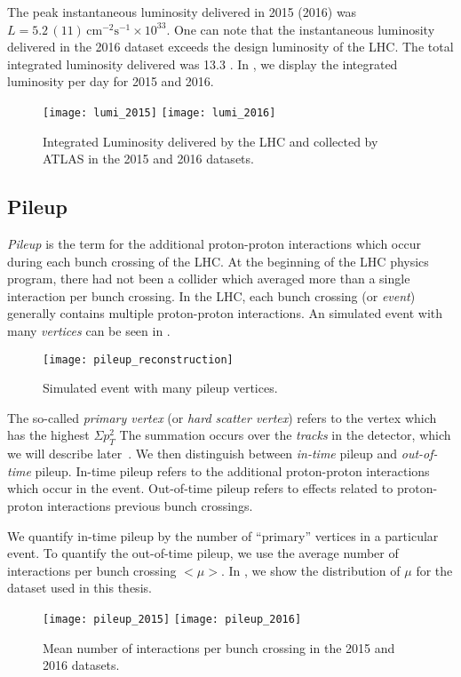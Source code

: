 The peak instantaneous luminosity delivered in 2015 (2016) was $L = 5.2 \, (11) \, \text{cm}^{-2} \text{s}^{-1} \times 10^{33} $.
One can note that the instantaneous luminosity delivered in the 2016 dataset exceeds the design luminosity of the LHC.
The total integrated luminosity delivered was 13.3 \ifb.
In , we display the integrated luminosity per day for 2015 and 2016.
\begin{figure}
\caption{Integrated Luminosity delivered by the LHC and collected by ATLAS in the 2015 and 2016 datasets.}\label{fig:lumi}
\texttt{[image: lumi\_2015]}
\texttt{[image: lumi\_2016]}
\end{figure}

\subsection{Pileup}

\textit{Pileup} is the term for the additional proton-proton interactions which occur during each bunch crossing of the LHC.
At the beginning of the LHC physics program, there had not been a collider which averaged more than a single interaction per bunch crossing.
In the LHC, each bunch crossing (or \textit{event})  generally contains multiple proton-proton interactions.
An simulated event with many \textit{vertices} can be seen in .
\begin{figure}
\caption{Simulated event with many pileup vertices.}\label{fig:pileup_reconstruction}
\texttt{[image: pileup\_reconstruction]}
\end{figure}
The so-called \textit{primary vertex} (or \textit{hard scatter vertex}) refers to the vertex which has the highest $\Sigma p_T^2$
The summation occurs over the \textit{tracks} in the detector, which we will describe later~\cite{ATL-INDET-PUB-2009-001}.
We then distinguish between \textit{in-time} pileup and \textit{out-of-time} pileup.
In-time pileup refers to the additional proton-proton interactions which occur in the event.
Out-of-time pileup refers to effects related to proton-proton interactions previous bunch crossings.

We quantify in-time pileup by the number of ``primary''\footnotemark \xspace vertices in a particular event.
To quantify the out-of-time pileup, we use the average number of interactions per bunch crossing $<\mu>$.
In , we show the distribution of $\mu$ for the dataset used in this thesis.
\begin{figure}
\caption{Mean number of interactions per bunch crossing in the 2015 and 2016 datasets.}\label{fig:pileup}
\texttt{[image: pileup\_2015]}
\texttt{[image: pileup\_2016]}
\end{figure}